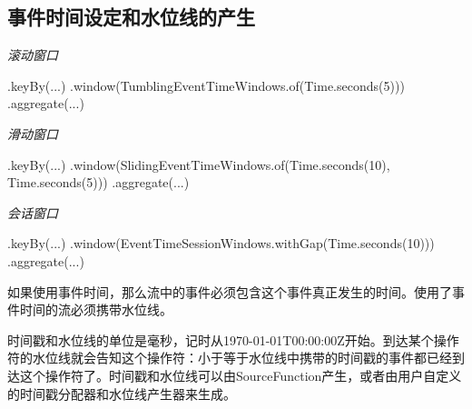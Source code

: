 \documentclass[cn,11pt,chinese]{elegantbook}
\newenvironment{Shaded}{}{}
\newcommand{\BuiltInTok}[1]{#1}
\newcommand{\DecValTok}[1]{\textcolor[rgb]{0.25,0.63,0.44}{#1}}
\newcommand{\FunctionTok}[1]{\textcolor[rgb]{0.02,0.16,0.49}{#1}}
\newcommand{\NormalTok}[1]{#1}
\begin{document}
\hypertarget{ux4e8bux4ef6ux65f6ux95f4ux8bbeux5b9aux548cux6c34ux4f4dux7ebfux7684ux4ea7ux751f}{%
\subsection{事件时间设定和水位线的产生}\label{ux4e8bux4ef6ux65f6ux95f4ux8bbeux5b9aux548cux6c34ux4f4dux7ebfux7684ux4ea7ux751f}}

\emph{滚动窗口}

\begin{Shaded}
\begin{Highlighting}[]
\NormalTok{.}\FunctionTok{keyBy}\NormalTok{(...)}
\NormalTok{.}\FunctionTok{window}\NormalTok{(TumblingEventTimeWindows.}\FunctionTok{of}\NormalTok{(}\BuiltInTok{Time}\NormalTok{.}\FunctionTok{seconds}\NormalTok{(}\DecValTok{5}\NormalTok{)))}
\NormalTok{.}\FunctionTok{aggregate}\NormalTok{(...)}
\end{Highlighting}
\end{Shaded}

\emph{滑动窗口}

\begin{Shaded}
\begin{Highlighting}[]
\NormalTok{.}\FunctionTok{keyBy}\NormalTok{(...)}
\NormalTok{.}\FunctionTok{window}\NormalTok{(SlidingEventTimeWindows.}\FunctionTok{of}\NormalTok{(}\BuiltInTok{Time}\NormalTok{.}\FunctionTok{seconds}\NormalTok{(}\DecValTok{10}\NormalTok{), }\BuiltInTok{Time}\NormalTok{.}\FunctionTok{seconds}\NormalTok{(}\DecValTok{5}\NormalTok{)))}
\NormalTok{.}\FunctionTok{aggregate}\NormalTok{(...)}
\end{Highlighting}
\end{Shaded}

\emph{会话窗口}

\begin{Shaded}
\begin{Highlighting}[]
\NormalTok{.}\FunctionTok{keyBy}\NormalTok{(...)}
\NormalTok{.}\FunctionTok{window}\NormalTok{(EventTimeSessionWindows.}\FunctionTok{withGap}\NormalTok{(}\BuiltInTok{Time}\NormalTok{.}\FunctionTok{seconds}\NormalTok{(}\DecValTok{10}\NormalTok{)))}
\NormalTok{.}\FunctionTok{aggregate}\NormalTok{(...)}
\end{Highlighting}
\end{Shaded}

如果使用事件时间，那么流中的事件必须包含这个事件真正发生的时间。使用了事件时间的流必须携带水位线。

时间戳和水位线的单位是毫秒，记时从1970-01-01T00:00:00Z开始。到达某个操作符的水位线就会告知这个操作符：小于等于水位线中携带的时间戳的事件都已经到达这个操作符了。时间戳和水位线可以由SourceFunction产生，或者由用户自定义的时间戳分配器和水位线产生器来生成。
\end{document}
